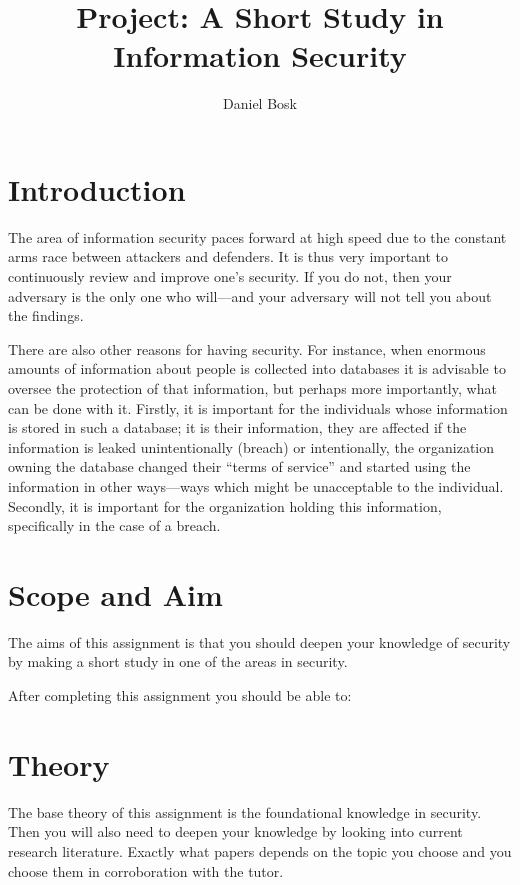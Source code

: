 \documentclass[a4paper]{llncs}
\title{Project: A Short Study in Information Security}
\author{%
  Daniel Bosk
}
\institute{%
  Department of Information and Communication Systems\\
  Mid Sweden University, Sundsvall
}
\begin{document}
\maketitle


\section{Introduction}%
\label{sec:intro}

The area of information security paces forward at high speed due to the 
constant arms race between attackers and defenders.
It is thus very important to continuously review and improve one's security.
If you do not, then your adversary is the only one who will---and your 
adversary will not tell you about the findings.

There are also other reasons for having security.
For instance, when enormous amounts of information about people is collected 
into databases it is advisable to oversee the protection of that information, 
but perhaps more importantly, what can be done with it.
Firstly, it is important for the individuals whose information is stored in such 
a database; it is their information, they are affected if the information is 
leaked unintentionally (breach) or intentionally, \eg the organization owning 
the database changed their \enquote{terms of service} and started using the 
information in other ways---ways which might be unacceptable to the individual.
Secondly, it is important for the organization holding this information, 
specifically in the case of a breach.


\section{Scope and Aim}%
\label{sec:goal}

The aims of this assignment is that you should deepen your knowledge of 
security by making a short study in one of the areas in security.

After completing this assignment you should be able to:
\begin{itemize}
	
\end{itemize}


\section{Theory}

The base theory of this assignment is the foundational knowledge in security.
Then you will also need to deepen your knowledge by looking into current 
research literature.
Exactly what papers depends on the topic you choose and you choose them in 
corroboration with the tutor.
\end{document}

